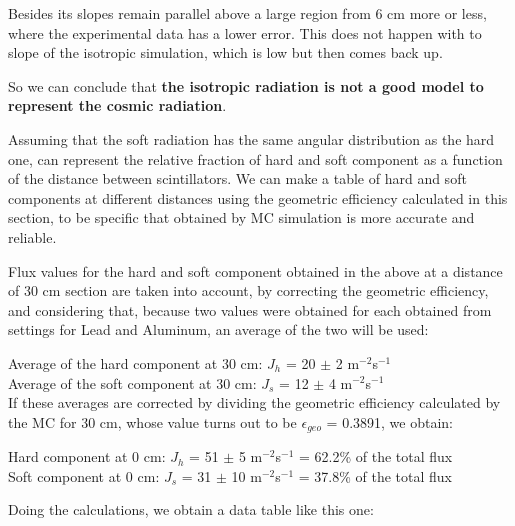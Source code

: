 Besides its slopes remain parallel above a large region from 6 cm more or less, where the experimental data has a lower error. This does not happen with to slope of the isotropic simulation, which is low but then comes back up.

So we can conclude that \textbf{the isotropic radiation is not a good model to represent the cosmic radiation}.

Assuming that the soft radiation has the same angular distribution as the hard one, can represent the relative fraction of hard and soft component as a function of the distance between scintillators. We can make a table of hard and soft components at different distances using the geometric efficiency calculated in this section, to be specific that obtained by MC simulation is more accurate and reliable.

Flux values for the hard and soft component obtained in the above at a distance of 30 cm section are taken into account, by correcting the geometric efficiency, and considering that, because two values were obtained for each obtained from settings for Lead and Aluminum, an average of the two will be used:

\bc
Average of the hard component at 30 cm: $J_h$ = 20 $\pm$ 2 m$^{-2}$s$^{-1}$\\
Average of the soft component at 30 cm: $J_s$ = 12 $\pm$ 4 m$^{-2}$s$^{-1}$\\
\ec
If these averages are corrected by dividing the geometric efficiency calculated by the MC for 30 cm, whose value turns out to be $\epsilon_{geo}$ = 0.3891, we obtain:

\bc
Hard component at 0 cm: $J_h$ = 51 $\pm$ 5 m$^{-2}$s$^{-1}$ = 62.2\% of the total flux\\
Soft component at 0 cm: $J_s$ = 31 $\pm$ 10 m$^{-2}$s$^{-1}$ = 37.8\% of the total flux\\
\ec

Doing the calculations, we obtain a data table like this one:


